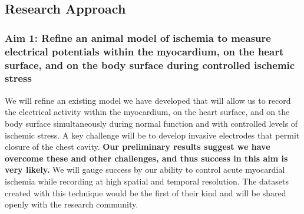 %
\subsection{Research Approach}
\label{sec:appr}

\subsubsection{Aim 1: Refine an animal model of ischemia to measure electrical potentials within the myocardium, on the heart surface, and on the body surface during controlled ischemic stress }
We will refine an existing model we have developed
\cite{RSM:Ara2016,BLZ:Zen2018a} that will allow us to record
the electrical activity within the myocardium, on the heart surface, and on
the body surface simultaneously during normal function and with controlled
levels of ischemic stress. A key challenge will be to develop invasive
electrodes that permit closure of the chest cavity. \textbf{Our
  preliminary results suggest we have overcome these and other challenges, and
  thus success in this aim is very likely.}
We will gauge success  by our ability to control acute
myocardial ischemia while recording at high spatial and temporal
resolution. The datasets created with this technique would be the first of
their kind and will be shared openly with the research community.

